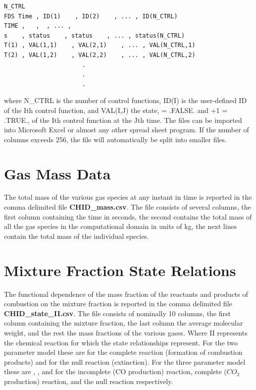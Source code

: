 \documentclass[11pt]{book}
\begin{document}
\footnotesize
\begin{verbatim}
N_CTRL
FDS Time , ID(1)    , ID(2)    , ... , ID(N_CTRL)
TIME ,   ,  , ... ,
s    , status    , status    , ... , status(N_CTRL)
T(1) , VAL(1,1)    , VAL(2,1)    , ... , VAL(N_CTRL,1)
T(2) , VAL(1,2)    , VAL(2,2)    , ... , VAL(N_CTRL,2)
                      .
                      .
                      .
\end{verbatim}
\normalsize
where {\ct N\_CTRL} is the number of control functions, {\ct ID(I)} is the user-defined
ID of the {\ct I}th control function, and
{\ct VAL(I,J)} the state, { = .FALSE. and +1 = .TRUE.}, of the {\ct I}th control function at the {\ct J}th time.
The files can be imported into Microsoft Excel or almost any other
spread sheet program. If the number of columns exceeds 256, the file will automatically be split into smaller files.


\section{Gas Mass Data}

The total mass of the various gas species at any instant in time
is reported in the comma delimited
file {\bf CHID\_mass.csv}. The file consists of several columns,
the first column containing the time in seconds, the second contains the
total mass of all the gas species in the computational domain in units of kg,
the next lines contain the total mass of the individual species.

\section{Mixture Fraction State Relations}

The functional dependence of the mass fraction of the reactants and
products of combustion on the mixture fraction is
reported in the comma delimited
file {\bf CHID\_state\_II.csv}. The file consists of nominally 10 columns,
the first column containing the mixture fraction, the last column the average molecular weight, and
the rest the mass fractions of the various gases.  Where {\ct II} represents the chemical reaction for
which the state relationships represent.  For the two parameter model these are {}
for the complete reaction (formation of combustion products) and {} for the null reaction
(extinction).  For the three parameter model these are {}, {}, and {} for the
incomplete (CO production) reaction, complete ($CO_2$ production) reaction, and the null
reaction respectively.
\end{document}
